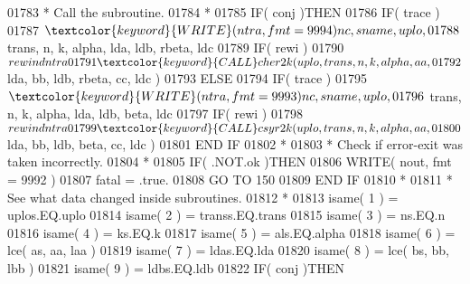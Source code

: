 \begin{DoxyCode}
01783 \textcolor{comment}{*                       Call the subroutine.}
01784 \textcolor{comment}{*}
01785                         \textcolor{keywordflow}{IF}( conj )\textcolor{keywordflow}{THEN}
01786                            \textcolor{keywordflow}{IF}( trace )
01787      $                        \textcolor{keyword}{WRITE}( ntra, fmt = 9994 )nc, sname, uplo,
01788      $                        trans, n, k, alpha, lda, ldb, rbeta, ldc
01789                            \textcolor{keywordflow}{IF}( rewi )
01790      $                        rewind ntra
01791                            \textcolor{keyword}{CALL }cher2k( uplo, trans, n, k, alpha, aa,
01792      $                                  lda, bb, ldb, rbeta, cc, ldc )
01793                         \textcolor{keywordflow}{ELSE}
01794                            \textcolor{keywordflow}{IF}( trace )
01795      $                        \textcolor{keyword}{WRITE}( ntra, fmt = 9993 )nc, sname, uplo,
01796      $                        trans, n, k, alpha, lda, ldb, beta, ldc
01797                            \textcolor{keywordflow}{IF}( rewi )
01798      $                        rewind ntra
01799                            \textcolor{keyword}{CALL }csyr2k( uplo, trans, n, k, alpha, aa,
01800      $                                  lda, bb, ldb, beta, cc, ldc )
01801 \textcolor{keywordflow}{                        END IF}
01802 \textcolor{comment}{*}
01803 \textcolor{comment}{*                       Check if error-exit was taken incorrectly.}
01804 \textcolor{comment}{*}
01805                         \textcolor{keywordflow}{IF}( .NOT.ok )\textcolor{keywordflow}{THEN}
01806                            \textcolor{keyword}{WRITE}( nout, fmt = 9992 )
01807                            fatal = .true.
01808                            \textcolor{keywordflow}{GO TO} 150
01809 \textcolor{keywordflow}{                        END IF}
01810 \textcolor{comment}{*}
01811 \textcolor{comment}{*                       See what data changed inside subroutines.}
01812 \textcolor{comment}{*}
01813                         isame( 1 ) = uplos.EQ.uplo
01814                         isame( 2 ) = transs.EQ.trans
01815                         isame( 3 ) = ns.EQ.n
01816                         isame( 4 ) = ks.EQ.k
01817                         isame( 5 ) = als.EQ.alpha
01818                         isame( 6 ) = lce( as, aa, laa )
01819                         isame( 7 ) = ldas.EQ.lda
01820                         isame( 8 ) = lce( bs, bb, lbb )
01821                         isame( 9 ) = ldbs.EQ.ldb
01822                         \textcolor{keywordflow}{IF}( conj )\textcolor{keywordflow}{THEN}

\end{DoxyCode}
